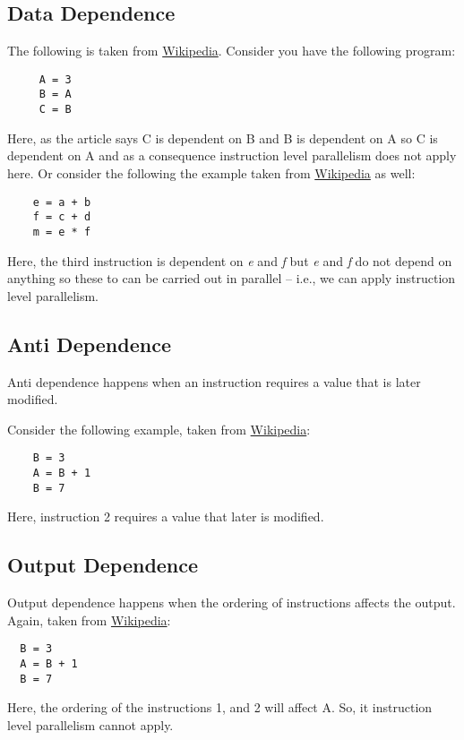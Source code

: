 \documentclass{amsbook}
\begin{document}
\subsection{Data Dependence}
The following is taken from \href{https://en.wikipedia.org/wiki/Data_dependency}{Wikipedia}. Consider you have the following program:

\begin{lstlisting}
     A = 3
     B = A
     C = B
\end{lstlisting}
Here, as the article says C is dependent on B and B is dependent on A so C is dependent on A and as a consequence instruction level parallelism does not apply here. Or consider the following the example taken from \href{https://en.wikipedia.org/wiki/Instruction-level_parallelism}{Wikipedia} as well:

\begin{lstlisting}
    e = a + b
    f = c + d
    m = e * f
\end{lstlisting}
Here, the third instruction is dependent on \textit{e} and \textit{f} but \textit{e} and \textit{f} do not depend on anything so these to can be carried out in parallel -- i.e.,  we can apply instruction level parallelism.

\subsection{Anti Dependence}
Anti dependence happens when an instruction requires a value that is later modified.

Consider the following example, taken from \href{https://en.wikipedia.org/wiki/Data_dependency}{Wikipedia}:

\begin{lstlisting}
    B = 3
    A = B + 1
    B = 7
\end{lstlisting}
Here, instruction 2 requires a value that later is modified.

\subsection{Output Dependence}
Output dependence happens when the ordering of instructions affects the output. Again, taken from \href{https://en.wikipedia.org/wiki/Data_dependency}{Wikipedia}:

\begin{lstlisting}
  B = 3
  A = B + 1
  B = 7
\end{lstlisting}
Here, the ordering of the instructions 1, and 2 will affect A. So, it instruction level parallelism cannot apply.
\end{document}
